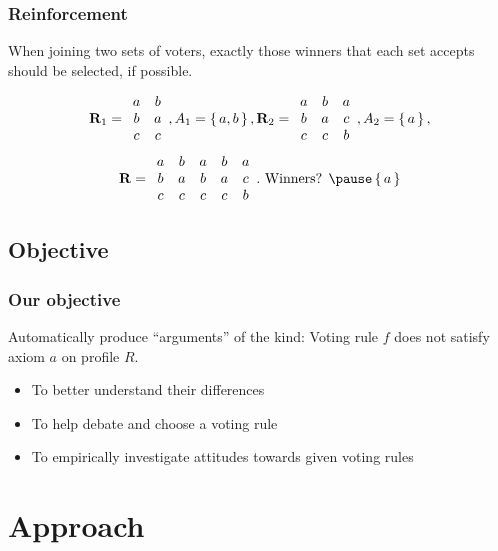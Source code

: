\documentclass[french,english]{beamer}
\begin{document}
\begin{frame}
	\frametitle{Reinforcement}
	\begin{definition}[Reinforcement]
		When joining two sets of voters, exactly those winners that each set accepts should be selected, if possible.
	\end{definition}
	\begin{example}
		\begin{equation}
			\mathbf{R}_1 =
			\begin{array}{cc}
				a&b\\
				b&a\\
				c&c\\
			\end{array},
			A_1 = \set{a, b},
			\mathbf{R}_2 =
			\begin{array}{ccc}
				a&b&a\\
				b&a&c\\
				c&c&b\\
			\end{array},
			A_2 = \set{a},
		\end{equation}
		\begin{equation}
			\prof =
			\begin{array}{ccccc}
				a&b&a&b&a\\
				b&a&b&a&c\\
				c&c&c&c&b\\
			\end{array}.
			\text{ Winners? }
			\pause
			\set{a}
		\end{equation}
	\end{example}
\end{frame}

\subsection{Objective}
\begin{frame}
	\frametitle{Our objective}
	Automatically produce “arguments” of the kind: Voting rule $f$ does not satisfy axiom $a$ on profile $R$.
	\begin{itemize}
		\item To better understand their differences
		\item To help debate and choose a voting rule
		\item To empirically investigate attitudes towards given voting rules
	\end{itemize}
\end{frame}

\section{Approach}
\end{document}
